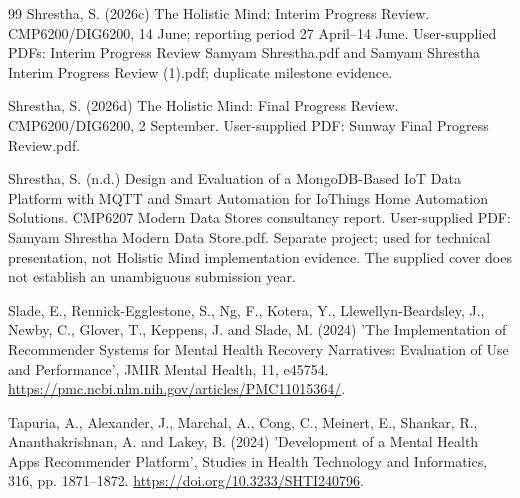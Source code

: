 \begin{thebibliography}{99}
Shrestha, S. (2026c) The Holistic Mind: Interim Progress Review. CMP6200/\allowbreak{}DIG6200, 14 June; reporting period 27 April--14 June. User-supplied PDFs: Interim Progress Review Samyam Shrestha.pdf and Samyam Shrestha Interim Progress Review (1).pdf; duplicate milestone evidence.

Shrestha, S. (2026d) The Holistic Mind: Final Progress Review. CMP6200/\allowbreak{}DIG6200, 2 September. User-supplied PDF: Sunway Final Progress Review.pdf.

Shrestha, S. (n.d.) Design and Evaluation of a MongoDB-Based IoT Data Platform with MQTT and Smart Automation for IoThings Home Automation Solutions. CMP6207 Modern Data Stores consultancy report. User-supplied PDF: Samyam Shrestha Modern Data Store.pdf. Separate project; used for technical presentation, not Holistic Mind implementation evidence. The supplied cover does not establish an unambiguous submission year.

Slade, E., Rennick-Egglestone, S., Ng, F., Kotera, Y., Llewellyn-Beardsley, J., Newby, C., Glover, T., Keppens, J. and Slade, M. (2024) 'The Implementation of Recommender Systems for Mental Health Recovery Narratives: Evaluation of Use and Performance', JMIR Mental Health, 11, e45754. \url{https://pmc.ncbi.nlm.nih.gov/articles/PMC11015364/}.

Tapuria, A., Alexander, J., Marchal, A., Cong, C., Meinert, E., Shankar, R., Ananthakrishnan, A. and Lakey, B. (2024) 'Development of a Mental Health Apps Recommender Platform', Studies in Health Technology and Informatics, 316, pp. 1871--1872. \url{https://doi.org/10.3233/SHTI240796}.
\end{thebibliography}
